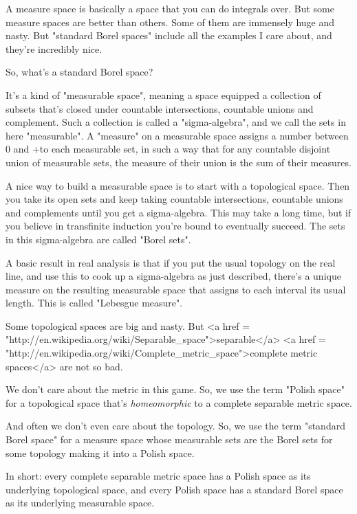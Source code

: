 A measure space is basically a space that you can do integrals over.
But some measure spaces are better than others.  Some of them are
immensely huge and nasty.  But "standard Borel spaces" include all 
the examples I care about, and they're incredibly nice.

So, what's a standard Borel space?  

It's a kind of "measurable space", meaning a space equipped a collection
of subsets that's closed under countable intersections, countable
unions and complement.  Such a collection is called a "sigma-algebra",
and we call the sets in here "measurable".  A "measure" on a measurable 
space assigns a number between 0 and +\infty  to each measurable set,
in such a way that for any countable disjoint union of measurable sets,
the measure of their union is the sum of their measures.  

A nice way to build a measurable space is to start with a topological
space.  Then you take its open sets and keep taking countable
intersections, countable unions and complements until you get a
sigma-algebra.  This may take a long time, but if you believe in
transfinite induction you're bound to eventually succeed.  The sets in
this sigma-algebra are called "Borel sets".

A basic result in real analysis is that if you put the usual
topology on the real line, and use this to cook up a sigma-algebra
as just described, there's a unique measure on the resulting measurable
space that assigns to each interval its usual length.  This is called
"Lebesgue measure".

Some topological spaces are big and nasty.  But 
<a href = "http://en.wikipedia.org/wiki/Separable_space">separable</a>
<a href = "http://en.wikipedia.org/wiki/Complete_metric_space">complete
metric spaces</a> are not so bad.  

We don't care about the metric in this game.  So, we use the term
"Polish space" for a topological space that's \emph{homeomorphic} to a
complete separable metric space.

And often we don't even care about the topology.  So, we use the
term "standard Borel space" for a measure space whose measurable
sets are the Borel sets for some topology making it into a Polish 
space. 

In short: every complete separable metric space has a Polish space as
its underlying topological space, and every Polish space has a 
standard Borel space as its underlying measurable space.

